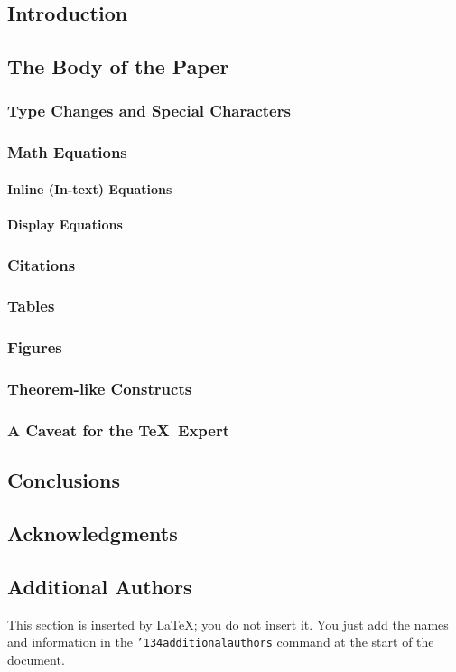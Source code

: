 \documentclass{acm_proc_article-sp-sigmod09}
\begin{document}
\subsection{Introduction}
\subsection{The Body of the Paper}
\subsubsection{Type Changes and  Special Characters}
\subsubsection{Math Equations}
\paragraph{Inline (In-text) Equations}
\paragraph{Display Equations}
\subsubsection{Citations}
\subsubsection{Tables}
\subsubsection{Figures}
\subsubsection{Theorem-like Constructs}
\subsubsection*{A Caveat for the \TeX\ Expert}
\subsection{Conclusions}
\subsection{Acknowledgments}
\subsection{Additional Authors}
This section is inserted by \LaTeX; you do not insert it.
You just add the names and information in the
\texttt{{\char'134}additionalauthors} command at the start
of the document.
\end{document}
